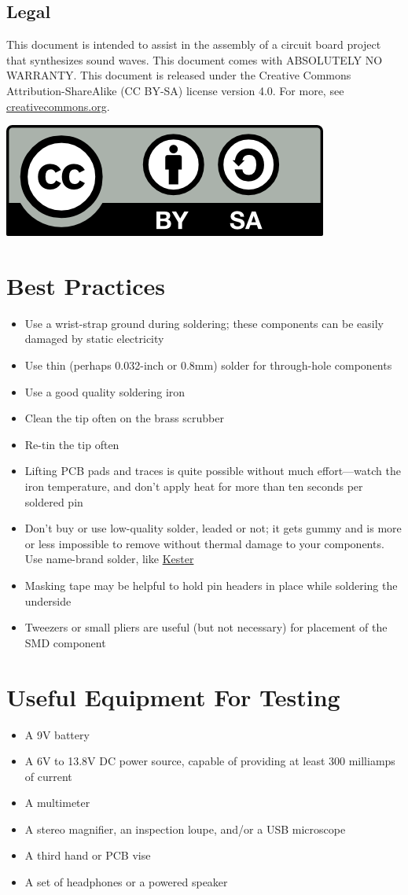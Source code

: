 \documentclass[12pt]{article}
\newcommand{\+}{\item}		%
\newcommand{\bi}{\begin{itemize}}
\newcommand{\ei}{\end{itemize}}
\begin{document}
\subsection*{Legal}

This document is intended to assist in the assembly of a circuit board project that synthesizes sound waves. This document comes with ABSOLUTELY NO WARRANTY. This document is released under the Creative Commons Attribution-ShareAlike  (CC BY-SA) license version 4.0. For more, see {\color{webblue}\href{https://creativecommons.org/licenses/}{creativecommons.org}}.
\begin{center}
\includegraphics[scale=1.0]{by-sa.png}
\end{center}



\section{Best Practices}
\bi
\+ Use a wrist-strap ground during soldering; these components can be easily damaged by static electricity
\+ Use thin (perhaps 0.032-inch or 0.8mm) solder for through-hole components
\+ Use a good quality soldering iron %
\+ Clean the tip often on the brass scrubber
\+ Re-tin the tip often
\+ Lifting PCB pads and traces is quite possible without much effort---watch the iron temperature, and don't apply heat for more than ten seconds per soldered pin 
\+ Don't buy or use low-quality solder, leaded or not; it gets gummy and is more or less impossible to remove without thermal damage to your components. Use name-brand solder, like {\color{webblue}\href{http://www.kester.com}{Kester}}
\+ Masking tape may be helpful to hold pin headers in place while soldering the underside
\+ Tweezers or small pliers are useful (but not necessary) for placement of the SMD component
\ei


\section{Useful Equipment For Testing}
\bi
\+ A 9V battery
\+ A 6V to 13.8V DC power source, capable of providing at least 300 milliamps of current
\+ A multimeter
\+ A stereo magnifier, an inspection loupe, and/or a USB microscope
\+ A third hand or PCB vise
\+ A set of headphones or a powered speaker
\ei
\end{document}
